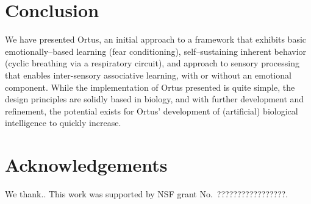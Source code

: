 \documentclass[letterpaper]{article}
\begin{document}
\section{Conclusion}
We have presented Ortus, an initial approach to a framework that exhibits basic emotionally--based learning (fear conditioning), self--sustaining inherent behavior (cyclic breathing via a respiratory circuit), and approach to sensory processing that enables inter-sensory associative learning, with or without an emotional component. While the implementation of Ortus presented is quite simple, the design principles are solidly based in biology, and with further development and refinement, the potential exists for Ortus' development of (artificial) biological intelligence to quickly increase. %



\section{Acknowledgements}

We thank..
This work was supported by NSF grant No.\ ?????????????????.

\footnotesize

\end{document}
